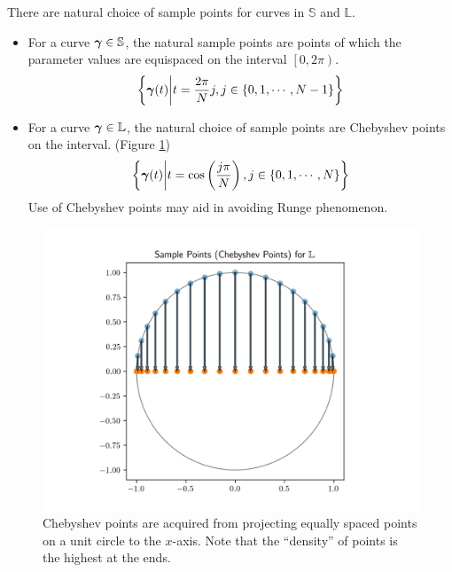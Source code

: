 \documentclass[../dissertation.tex]{subfiles}
\begin{document}
There are natural choice of sample points for curves in $\mathbb{S}$ and $\mathbb{L}$.
\begin{itemize}
    \item For a curve $\boldsymbol{\gamma} \in \mathbb{S}$, the natural sample points are points of which the parameter values are equispaced on the interval $\left[ 0,2\pi \right)$.
        \begin{equation}
\left\{ \boldsymbol{\gamma}(t) \middle| t = \frac{2\pi}{N}j, j \in \left\{ 0, 1, \cdots, N-1 \right\} \right\}
        \end{equation}
    \item For a curve $\boldsymbol{\gamma} \in \mathbb{L}$, the natural choice of sample points are Chebyshev points on the interval. (Figure \ref{fig: Chebyshev Points})
        \begin{equation}
            \left\{ \boldsymbol{\gamma}(t) \middle| t = \cos \left( \frac{j \pi}{N} \right), j \in \left\{ 0, 1, \cdots, N \right\} \right\}
        \end{equation}
Use of Chebyshev points may aid in avoiding Runge phenomenon\cite{Trefethen_2020}.
\end{itemize}
\begin{figure}[tbp]
    \centering
    \includegraphics[width=\textwidth]{sections/FourierSeriesImgs/ChebyshevPoints}
    \caption{Chebyshev points are acquired from projecting equally spaced points on a unit circle to the $x$-axis.
    Note that the ``density'' of points is the highest at the ends.}
    \label{fig: Chebyshev Points}
\end{figure}
\end{document}
